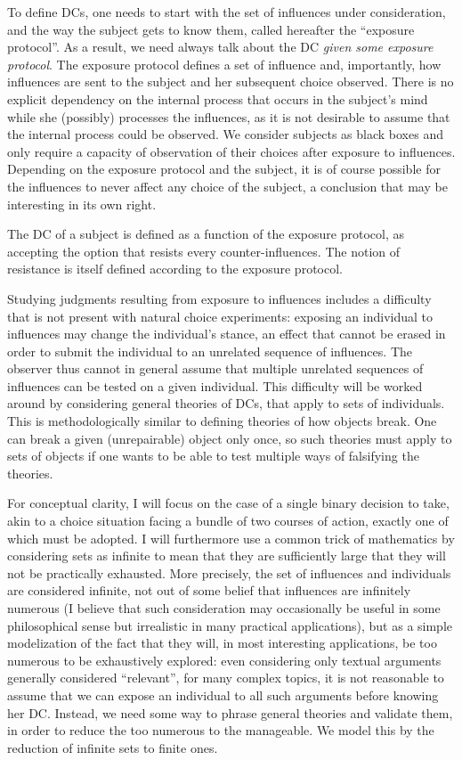 \documentclass[version=last, pagesize, twoside=off, bibliography=totoc, fontsize=12pt, a4paper, french, english]{scrartcl}
\begin{document}
To define \acp{DC}, one needs to start with the set of influences under consideration, and the way the subject gets to know them, called hereafter the “exposure protocol”. As a result, we need always talk about the \ac{DC} \emph{given some exposure protocol}.
The exposure protocol defines a set of influence and, importantly, how influences are sent to the subject and her subsequent choice observed. There is no explicit dependency on the internal process that occurs in the subject’s mind while she (possibly) processes the influences, as it is not desirable to assume that the internal process could be observed. We consider subjects as black boxes and only require a capacity of observation of their choices after exposure to influences. Depending on the exposure protocol and the subject, it is of course possible for the influences to never affect any choice of the subject, a conclusion that may be interesting in its own right.

The \ac{DC} of a subject is defined as a function of the exposure protocol, as accepting the option that resists every counter-influences. The notion of resistance is itself defined according to the exposure protocol.

Studying judgments resulting from exposure to influences includes a difficulty that is not present with natural choice experiments: exposing an individual to influences may change the individual’s stance, an effect that cannot be erased in order to submit the individual to an unrelated sequence of influences. The observer thus cannot in general assume that multiple unrelated sequences of influences can be tested on a given individual. This difficulty will be worked around by considering general theories of \acp{DC}, that apply to sets of individuals. This is methodologically similar to defining theories of how objects break. One can break a given (unrepairable) object only once, so such theories must apply to sets of objects if one wants to be able to test multiple ways of falsifying the theories.

For conceptual clarity, I will focus on the case of a single binary decision to take, akin to a choice situation facing a bundle of two courses of action, exactly one of which must be adopted.
I will furthermore use a common trick of mathematics by considering sets as infinite to mean that they are sufficiently large that they will not be practically exhausted.
More precisely, the set of influences and individuals are considered infinite, not out of some belief that influences are infinitely numerous (I believe that such consideration may occasionally be useful in some philosophical sense but irrealistic in many practical applications), but as a simple modelization of the fact that they will, in most interesting applications, be too numerous to be exhaustively explored: even considering only textual arguments generally considered “relevant”, for many complex topics, it is not reasonable to assume that we can expose an individual to all such arguments before knowing her \ac{DC}. Instead, we need some way to phrase general theories and validate them, in order to reduce the too numerous to the manageable. We model this by the reduction of infinite sets to finite ones.
\end{document}
